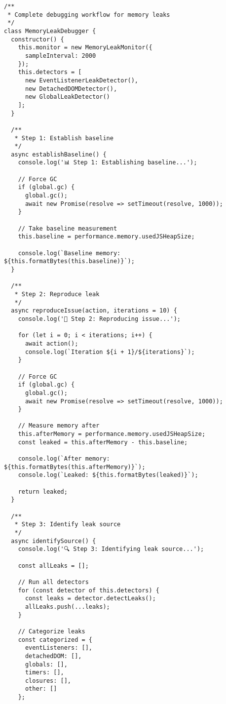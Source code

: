 \documentclass[11pt]{article}
\begin{document}
\begin{verbatim}
/**
 * Complete debugging workflow for memory leaks
 */
class MemoryLeakDebugger {
  constructor() {
    this.monitor = new MemoryLeakMonitor({
      sampleInterval: 2000
    });
    this.detectors = [
      new EventListenerLeakDetector(),
      new DetachedDOMDetector(),
      new GlobalLeakDetector()
    ];
  }
  
  /**
   * Step 1: Establish baseline
   */
  async establishBaseline() {
    console.log('📊 Step 1: Establishing baseline...');
    
    // Force GC
    if (global.gc) {
      global.gc();
      await new Promise(resolve => setTimeout(resolve, 1000));
    }
    
    // Take baseline measurement
    this.baseline = performance.memory.usedJSHeapSize;
    
    console.log(`Baseline memory: ${this.formatBytes(this.baseline)}`);
  }
  
  /**
   * Step 2: Reproduce leak
   */
  async reproduceIssue(action, iterations = 10) {
    console.log('🔄 Step 2: Reproducing issue...');
    
    for (let i = 0; i < iterations; i++) {
      await action();
      console.log(`Iteration ${i + 1}/${iterations}`);
    }
    
    // Force GC
    if (global.gc) {
      global.gc();
      await new Promise(resolve => setTimeout(resolve, 1000));
    }
    
    // Measure memory after
    this.afterMemory = performance.memory.usedJSHeapSize;
    const leaked = this.afterMemory - this.baseline;
    
    console.log(`After memory: ${this.formatBytes(this.afterMemory)}`);
    console.log(`Leaked: ${this.formatBytes(leaked)}`);
    
    return leaked;
  }
  
  /**
   * Step 3: Identify leak source
   */
  async identifySource() {
    console.log('🔍 Step 3: Identifying leak source...');
    
    const allLeaks = [];
    
    // Run all detectors
    for (const detector of this.detectors) {
      const leaks = detector.detectLeaks();
      allLeaks.push(...leaks);
    }
    
    // Categorize leaks
    const categorized = {
      eventListeners: [],
      detachedDOM: [],
      globals: [],
      timers: [],
      closures: [],
      other: []
    };
    

\end{verbatim}
\end{document}
